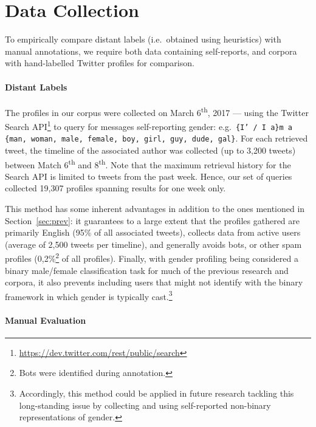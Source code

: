 \documentclass[11pt,letterpaper]{article}
\begin{document}
\section{Data Collection}

To empirically compare distant labels (i.e.\ obtained using heuristics) with
manual annotations, we require both data containing self-reports, and corpora
with hand-labelled Twitter profiles for comparison.

\paragraph{Distant Labels}

The profiles in our corpus were collected on March 6\textsuperscript{th}, 2017
--- using the Twitter
Search API\footnote{\url{https://dev.twitter.com/rest/public/search}} to
query for messages self-reporting gender: e.g.\ \texttt{\{I' / I a\}m a \{man,
	woman, male, female, boy, girl, guy, dude, gal\}}. For each retrieved
tweet, the timeline of the associated author was collected (up to 3,200 tweets)
between Match 6\textsuperscript{th} and 8\textsuperscript{th}. Note that the
maximum retrieval history for the Search API is limited to tweets
from the past week. Hence, our set of queries collected 19,307 profiles spanning
results for one week only.

This method has some inherent advantages in addition to the ones mentioned in
Section~\ref{sec:prev}: it guarantees to a large extent that
the profiles gathered are primarily English (95\% of all associated tweets),
collects data from active users (average of 2,500 tweets per timeline),
and generally avoids bots, or other spam profiles
(0,2\%\footnote{Bots were identified during annotation.} of all profiles).
Finally, with gender profiling being considered a binary male/female classification task
for much of the previous research and corpora, it also prevents including
users that might not identify with the binary framework in which gender is
typically cast.\footnote{Accordingly, this method could be applied in future
research tackling this long-standing issue by collecting and using self-reported
non-binary representations of gender.}

\paragraph{Manual Evaluation}
\end{document}
